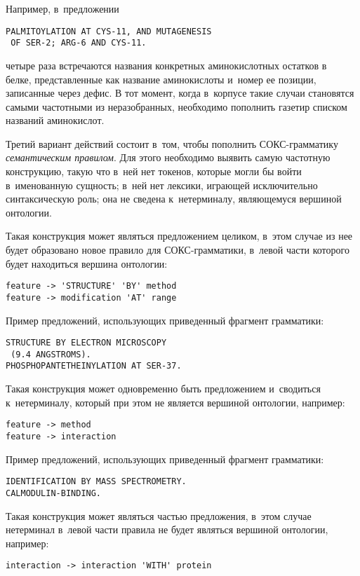 \begin{multicols}{2}
  Например, в~предложении
  \begin{verbatim}
PALMITOYLATION AT CYS-11, AND MUTAGENESIS
 OF SER-2; ARG-6 AND CYS-11.
\end{verbatim}
\noindent
четыре раза встречаются названия конкретных аминокислотных остатков в~
белке, представленные как название аминокислоты и~номер ее позиции, 
записанные через дефис. В тот момент, когда в~корпусе такие случаи 
становятся самыми частотными из неразобранных, необходимо пополнить 
газетир списком названий аминокислот.

  Третий вариант действий состоит в~том, чтобы пополнить  
СОКС-грам\-ма\-ти\-ку \textit{семантическим правилом}. Для этого 
необходимо выявить самую час\-тот\-ную конструкцию, такую что в~ней нет 
токенов, которые могли бы войти в~именованную сущность; в~ней нет лексики, 
играющей исключительно синтаксическую роль; она не сведена к~нетерминалу, 
являющемуся вершиной онтологии.
  
  Такая конструкция может являться предложением целиком, в~этом случае из 
нее будет образовано новое правило для СОКС-грамматики, в~левой час\-ти 
которого будет находиться вершина онтологии:
  \begin{verbatim}
feature -> 'STRUCTURE' 'BY' method
feature -> modification 'AT' range
\end{verbatim}


  Пример предложений, использующих приведенный фрагмент грамматики:
  \begin{verbatim}
STRUCTURE BY ELECTRON MICROSCOPY
 (9.4 ANGSTROMS).
PHOSPHOPANTETHEINYLATION AT SER-37.
\end{verbatim}

  Такая конструкция может одновременно быть предложением и~сводиться 
к~нетерминалу, который при этом не является вершиной онтологии, например:
  \begin{verbatim}
feature -> method
feature -> interaction
\end{verbatim}

  Пример предложений, использующих приведенный фрагмент грамматики:
  \begin{verbatim}
IDENTIFICATION BY MASS SPECTROMETRY.
CALMODULIN-BINDING.
\end{verbatim}

  Такая конструкция может являться частью предложения, в~этом случае 
нетерминал в~левой части правила не будет являться вершиной онтологии, 
например:
  \begin{verbatim}
interaction -> interaction 'WITH' protein
\end{verbatim}


\end{multicols}
